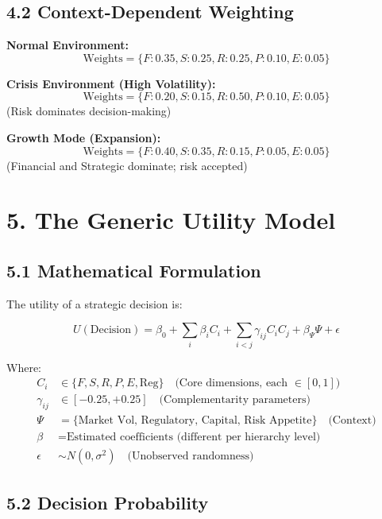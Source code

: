 \documentclass[11pt]{article}
\begin{document}
\subsection{4.2 Context-Dependent Weighting}

\textbf{Normal Environment:}
$$\text{Weights} = \{F: 0.35, S: 0.25, R: 0.25, P: 0.10, E: 0.05\}$$

\textbf{Crisis Environment (High Volatility):}
$$\text{Weights} = \{F: 0.20, S: 0.15, R: 0.50, P: 0.10, E: 0.05\}$$
(Risk dominates decision-making)

\textbf{Growth Mode (Expansion):}
$$\text{Weights} = \{F: 0.40, S: 0.35, R: 0.15, P: 0.05, E: 0.05\}$$
(Financial and Strategic dominate; risk accepted)

\section{5. The Generic Utility Model}

\subsection{5.1 Mathematical Formulation}

The utility of a strategic decision is:

\begin{equation}
U(\text{Decision}) = \beta_0 + \sum_{i} \beta_i C_i + \sum_{i<j} \gamma_{ij} C_i C_j + \beta_\Psi \Psi + \epsilon
\end{equation}

Where:
\begin{align*}
C_i &\in \{F, S, R, P, E, \text{Reg}\} \quad \text{(Core dimensions, each } \in [0,1]) \\
\gamma_{ij} &\in [-0.25, +0.25] \quad \text{(Complementarity parameters)} \\
\Psi &= \{\text{Market Vol, Regulatory, Capital, Risk Appetite}\} \quad \text{(Context)} \\
\beta &= \text{Estimated coefficients (different per hierarchy level)} \\
\epsilon &\sim N(0, \sigma^2) \quad \text{(Unobserved randomness)}
\end{align*}

\subsection{5.2 Decision Probability}
\end{document}
